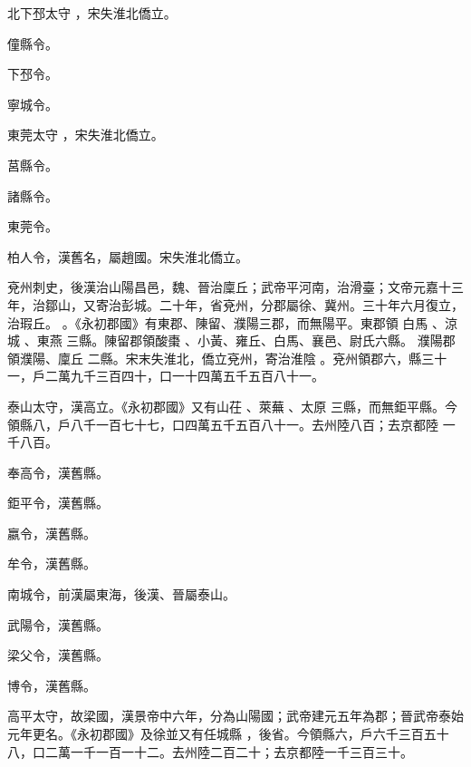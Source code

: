 \begin{pinyinscope}
北下邳太守
 ，宋失淮北僑立。


僮縣令。


下邳令。


寧城令。


東莞太守
 ，宋失淮北僑立。


莒縣令。


諸縣令。


東莞令。



 柏人令，漢舊名，屬趙國。宋失淮北僑立。


兗州刺史，後漢治山陽昌邑，魏、晉治廩丘；武帝平河南，治滑臺；文帝元嘉十三年，治鄒山，又寄治彭城。二十年，省兗州，分郡屬徐、冀州。三十年六月復立，治瑕丘。
 。《永初郡國》有東郡、陳留、濮陽三郡，而無陽平。東郡領
 白馬
 、涼城
 、東燕
 三縣。陳留郡領酸棗
 、小黃、雍丘、白馬、襄邑、尉氏六縣。
 濮陽郡領濮陽、廩丘
 二縣。宋末失淮北，僑立兗州，寄治淮陰
 。兗州領郡六，縣三十一，戶二萬九千三百四十，口一十四萬五千五百八十一。


泰山太守，漢高立。《永初郡國》又有山茌
 、萊蕪
 、太原
 三縣，而無鉅平縣。今領縣八，戶八千一百七十七，口四萬五千五百八十一。去州陸八百；去京都陸
 一千八百。



 奉高令，漢舊縣。



 鉅平令，漢舊縣。



 嬴令，漢舊縣。



 牟令，漢舊縣。



 南城令，前漢屬東海，後漢、晉屬泰山。



 武陽令，漢舊縣。



 梁父令，漢舊縣。



 博令，漢舊縣。


高平太守，故梁國，漢景帝中六年，分為山陽國；武帝建元五年為郡；晉武帝泰始元年更名。《永初郡國》及徐並又有任城縣
 ，後省。今領縣六，戶六千三百五十八，口二萬一千一百一十二。去州陸二百二十；去京都陸一千三百三十。




\end{pinyinscope}
